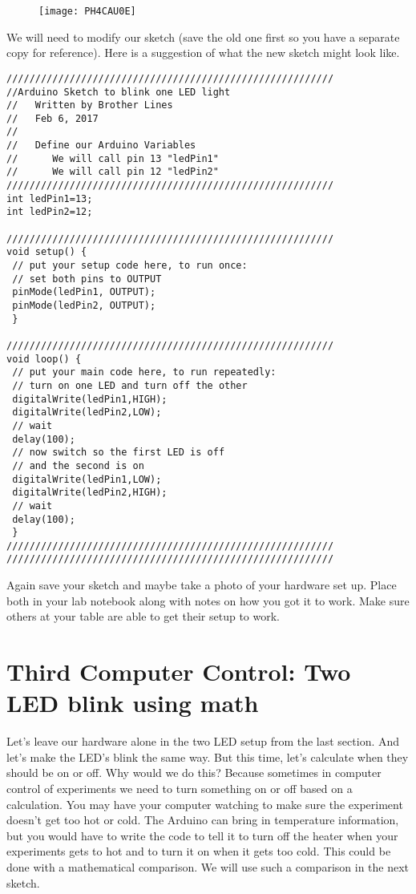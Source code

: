 \begin{figure}[h!]
\texttt{[image: PH4CAU0E]}
\end{figure}We will need to modify our sketch
(save the old one first so you have a separate copy for reference). Here is
a suggestion of what the new sketch might look like.
 \begin{lstlisting}[language=Arduino]
/////////////////////////////////////////////////////////
//Arduino Sketch to blink one LED light
//   Written by Brother Lines
//   Feb 6, 2017
//
//   Define our Arduino Variables
//      We will call pin 13 "ledPin1"
//      We will call pin 12 "ledPin2"
/////////////////////////////////////////////////////////
int ledPin1=13;
int ledPin2=12;
 
/////////////////////////////////////////////////////////
void setup() {
 // put your setup code here, to run once:
 // set both pins to OUTPUT
 pinMode(ledPin1, OUTPUT);
 pinMode(ledPin2, OUTPUT);
 }
 
/////////////////////////////////////////////////////////
void loop() {
 // put your main code here, to run repeatedly:
 // turn on one LED and turn off the other
 digitalWrite(ledPin1,HIGH);
 digitalWrite(ledPin2,LOW);
 // wait
 delay(100);
 // now switch so the first LED is off
 // and the second is on
 digitalWrite(ledPin1,LOW);
 digitalWrite(ledPin2,HIGH);
 // wait
 delay(100);
 }
/////////////////////////////////////////////////////////
/////////////////////////////////////////////////////////
 \end{lstlisting}

Again save your sketch and maybe take a photo of your hardware set up. Place
both in your lab notebook along with notes on how you got it to work. Make
sure others at your table are able to get their setup to work.

\section{Third Computer Control: Two LED blink using math}

Let's leave our hardware alone in the two LED setup from the last section.
And let's make the LED's blink the same way. But this time, let's calculate
when they should be on or off. Why would we do this? Because sometimes in
computer control of experiments we need to turn something on or off based on
a calculation. You may have your computer watching to make sure the
experiment doesn't get too hot or cold. The Arduino can bring in temperature
information, but you would have to write the code to tell it to turn off the
heater when your experiments gets to hot and to turn it on when it gets too
cold. This could be done with a mathematical comparison. We will use such a
comparison in the next sketch.


